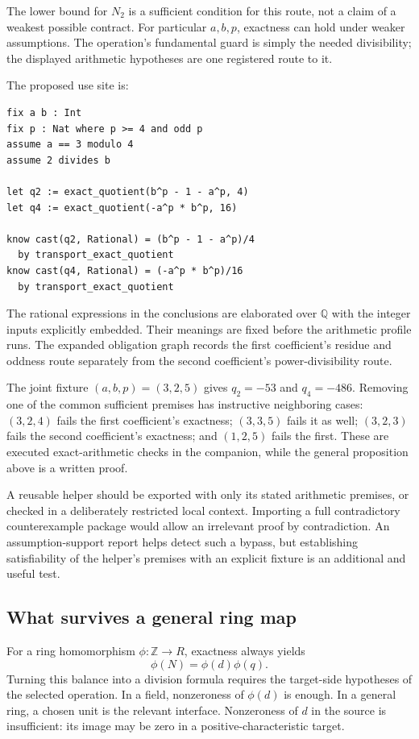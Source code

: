 \documentclass[11pt,a4paper]{article}
\newcommand{\Z}{\mathbb Z}
\newcommand{\Q}{\mathbb Q}
\theoremstyle{definition}
\theoremstyle{remark}
\begin{document}
The lower bound for $N_2$ is a sufficient condition for this route, not a claim
of a weakest possible contract. For particular $a,b,p$, exactness can hold
under weaker assumptions. The operation's fundamental guard is simply the
needed divisibility; the displayed arithmetic hypotheses are one registered
route to it.

The proposed use site is:
\begin{lstlisting}
fix a b : Int
fix p : Nat where p >= 4 and odd p
assume a == 3 modulo 4
assume 2 divides b

let q2 := exact_quotient(b^p - 1 - a^p, 4)
let q4 := exact_quotient(-a^p * b^p, 16)

know cast(q2, Rational) = (b^p - 1 - a^p)/4
  by transport_exact_quotient
know cast(q4, Rational) = (-a^p * b^p)/16
  by transport_exact_quotient
\end{lstlisting}
The rational expressions in the conclusions are elaborated over $\Q$ with the
integer inputs explicitly embedded. Their meanings are fixed before the
arithmetic profile runs. The expanded obligation graph records the first
coefficient's residue and oddness route separately from the second coefficient's
power-divisibility route.

The joint fixture $(a,b,p)=(3,2,5)$ gives $q_2=-53$ and $q_4=-486$. Removing
one of the common sufficient premises has instructive neighboring cases:
$(3,2,4)$ fails the first coefficient's exactness; $(3,3,5)$ fails it as well;
$(3,2,3)$ fails the second coefficient's exactness; and $(1,2,5)$ fails the
first. These are executed exact-arithmetic checks in the companion, while the
general proposition above is a written proof.

A reusable helper should be exported with only its stated arithmetic premises,
or checked in a deliberately restricted local context. Importing a full
contradictory counterexample package would allow an irrelevant proof by
contradiction. An assumption-support report helps detect such a bypass, but
establishing satisfiability of the helper's premises with an explicit fixture
is an additional and useful test.

\subsection{What survives a general ring map}

For a ring homomorphism $\phi:\Z\to R$, exactness always yields
\[
 \phi(N)=\phi(d)\phi(q).
\]
Turning this balance into a division formula requires the target-side
hypotheses of the selected operation. In a field, nonzeroness of $\phi(d)$
is enough. In a general ring, a chosen unit is the relevant interface.
Nonzeroness of $d$ in the source is insufficient: its image may be zero in a
positive-characteristic target.
\end{document}
